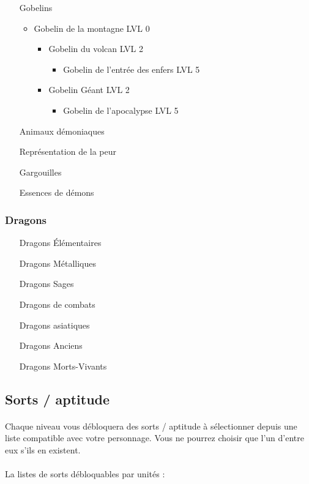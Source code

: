 \begin{itemize}
	\item[Gobelins] ~\\
		\begin{itemize}
			\item Gobelin de la montagne LVL 0
				\begin{itemize}
					\item Gobelin du volcan LVL 2
						\begin{itemize}
							\item Gobelin de l'entrée des enfers LVL 5
						\end{itemize}
					\item Gobelin Géant LVL 2
						\begin{itemize}
							\item Gobelin de l'apocalypse LVL 5
						\end{itemize}
				\end{itemize}
		\end{itemize}
	\item[Animaux démoniaques]
	\item[Représentation de la peur]
	\item[Gargouilles]
	\item[Essences de démons]
\end{itemize}

\subsubsection{Dragons}

\begin{itemize}
	\item[Dragons Élémentaires]
	\item[Dragons Métalliques]
	\item[Dragons Sages]
	\item[Dragons de combats]
	\item[Dragons asiatiques]
	\item[Dragons Anciens]
	\item[Dragons Morts-Vivants]
\end{itemize}

\subsection{Sorts / aptitude}

\paragraph{} Chaque niveau vous débloquera des sorts / aptitude à sélectionner depuis une liste compatible avec votre personnage. Vous ne pourrez choisir que l'un d'entre eux s'ils en existent.

\paragraph{} La listes de sorts débloquables par unités :
